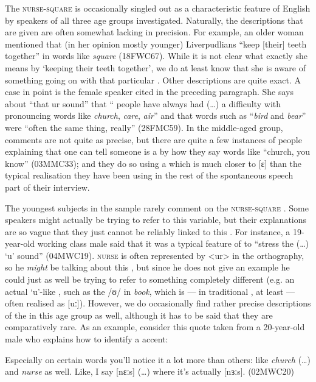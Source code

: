 The \textsc{nurse}-\textsc{square}  is occasionally singled out as a characteristic feature of  English by speakers of all three age groups investigated.
Naturally, the descriptions that are given are often somewhat lacking in precision.
For example, an older woman mentioned that (in her opinion mostly younger) Liverpudlians ``keep [their] teeth together'' in words like \emph{square} (18FWC67).
While it is not clear what exactly she means by `keeping their teeth together', we do at least know that she is aware of something going on with that particular .
Other descriptions are quite exact.
A case in point is the female speaker cited in the preceding paragraph.
She says about ``that ur sound'' that  `` people have always had (\ldots) a difficulty with pronouncing words like \emph{church}, \emph{care}, \emph{air}'' and that words such as ``\emph{bird} and \emph{bear}'' were ``often the same thing, really'' (28FMC59).
In the middle-aged group, comments are not quite as precise, but there are quite a few instances of people explaining that one can tell someone is a  by how they say words like ``church, you know'' (03MMC33); and they do so using a  which is much closer to [ɛ] than the typical realisation they have been using in the rest of the spontaneous speech part of their interview.

The youngest subjects in the sample rarely comment on the \textsc{nurse}-\textsc{square} .
Some speakers might actually be trying to refer to this variable, but their explanations are so vague that they just cannot be reliably linked to this .
For instance, a 19-year-old working class male said that it was a typical feature of  to ``stress the (\ldots) `u' sound'' (04MWC19).
\textsc{nurse} is often represented by <ur> in the orthography, so he \emph{might} be talking about this , but since he does not give an example he could just as well be trying to refer to something completely different (e.g. an actual `u'-like , such as the /ʊ/ in \emph{book}, which is --- in traditional , at least --- often realised as [uː]).
However, we do occasionally find rather precise descriptions of the  in this age group as well, although it has to be said that they are comparatively rare.
As an example, consider this quote taken from a 20-year-old male who explains how to identify a  accent:
\begin{example}
	Especially on certain words you'll notice it a lot more than others: like \emph{church} (\ldots) and \emph{nurse} as well.
	Like, I say [nɛːs] (\ldots) where it's actually [nɜːs]. (02MWC20)
\end{example}

